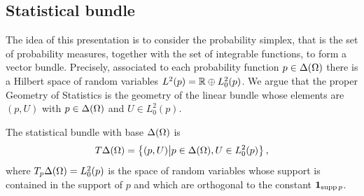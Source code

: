 \documentclass[12pt,a4paper]{amsart}
\begin{document}

\subsection{Statistical bundle}

The idea of this presentation is to consider the probability simplex, that is the set of probability measures, together with the set of integrable functions, to form a vector bundle. Precisely, associated to each probability function $p \in \Delta(\Omega)$ there is a Hilbert space of random variables $L^2(p) = \mathbb R \oplus L^2_0(p)$. We argue that the proper Geometry of Statistics is the geometry of the linear bundle whose elements are $(p,U)$ with $p \in \Delta(\Omega)$ and $U \in L^2_0(p)$. 

\begin{definition}
  The statistical bundle with base $\Delta(\Omega)$ is
%
  \begin{equation*}
    T\Delta(\Omega) = \left\{ (p,U) \middle| p \in \Delta(\Omega), U \in L^2_0(p) \right\},
  \end{equation*}
%
where $T_p\Delta(\Omega) = L^2_0(p)$ is the space of random variables whose support is contained in the support of $p$ and which are orthogonal to the constant $\bm 1_{\operatorname{supp}{p}}$. 
\end{definition}
\end{document}
